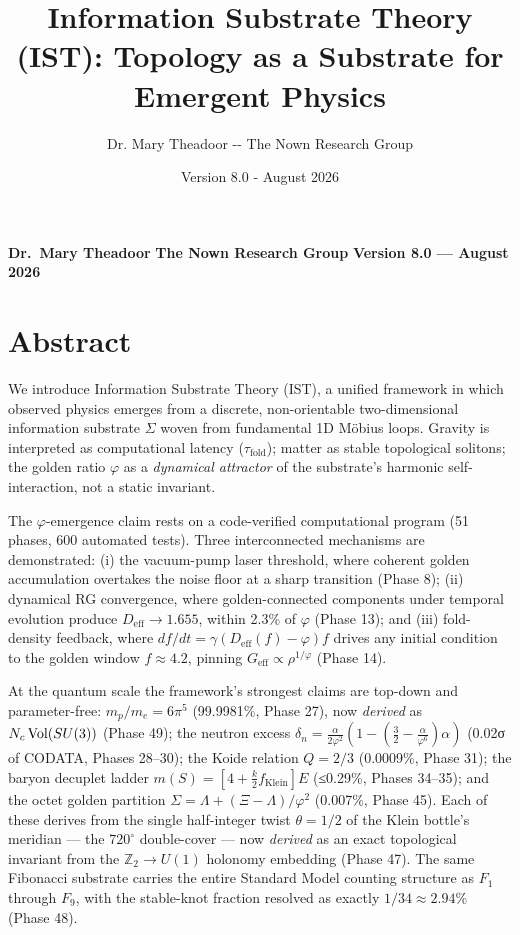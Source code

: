 \documentclass[
  11pt,
]{article}
\title{Information Substrate Theory (IST): Topology as a Substrate for
Emergent Physics}
\author{Dr. Mary Theadoor -\/- The Nown Research Group}
\date{Version 8.0 - August 2026}
\begin{document}
\maketitle

{
\setcounter{tocdepth}{3}
\tableofcontents
}
\textbf{Dr.~Mary Theadoor} \textbf{The Nown Research Group}
\textbf{Version 8.0 --- August 2026}

\section{Abstract}\label{abstract}

We introduce Information Substrate Theory (IST), a unified framework in
which observed physics emerges from a discrete, non-orientable
two-dimensional information substrate \(\Sigma\) woven from fundamental
1D Möbius loops. Gravity is interpreted as computational latency
(\(\tau_{\text{fold}}\)); matter as stable topological solitons; the
golden ratio \(\varphi\) as a \emph{dynamical attractor} of the
substrate's harmonic self-interaction, not a static invariant.

The \(\varphi\)-emergence claim rests on a code-verified computational
program (51 phases, 600 automated tests). Three interconnected
mechanisms are demonstrated: (i) the vacuum-pump laser threshold, where
coherent golden accumulation overtakes the noise floor at a sharp
transition (Phase 8); (ii) dynamical RG convergence, where
golden-connected components under temporal evolution produce
\(D_{\text{eff}} \to 1.655\), within 2.3\% of \(\varphi\) (Phase 13);
and (iii) fold-density feedback, where
\(df/dt = \gamma(D_{\text{eff}}(f) - \varphi)f\) drives any initial
condition to the golden window \(f \approx 4.2\), pinning
\(G_{\text{eff}} \propto \rho^{1/\varphi}\) (Phase 14).

At the quantum scale the framework's strongest claims are top-down and
parameter-free: \(m_p/m_e = 6\pi^5\) (99.9981\%, Phase 27), now
\emph{derived} as \(N_c\,{\rm Vol}(SU(3))\) (Phase 49); the neutron
excess
\(\delta_n = \frac{\alpha}{2\varphi^2}(1 - (\frac{3}{2} - \frac{\alpha}{\varphi^6})\alpha)\)
(0.02σ of CODATA, Phases 28--30); the Koide relation \(Q = 2/3\)
(0.0009\%, Phase 31); the baryon decuplet ladder
\(m(S) = [4 + \frac{k}{2}f_{\text{Klein}}]E\) (≤0.29\%, Phases 34--35);
and the octet golden partition
\(\Sigma = \Lambda + (\Xi-\Lambda)/\varphi^2\) (0.007\%, Phase 45). Each
of these derives from the single half-integer twist \(\theta = 1/2\) of
the Klein bottle's meridian --- the \(720^{\circ}\) double-cover --- now
\emph{derived} as an exact topological invariant from the
\(\mathbb{Z}_2 \to U(1)\) holonomy embedding (Phase 47). The same
Fibonacci substrate carries the entire Standard Model counting structure
as \(F_1\) through \(F_9\), with the stable-knot fraction resolved as
exactly \(1/34 \approx 2.94\%\) (Phase 48).
\end{document}

